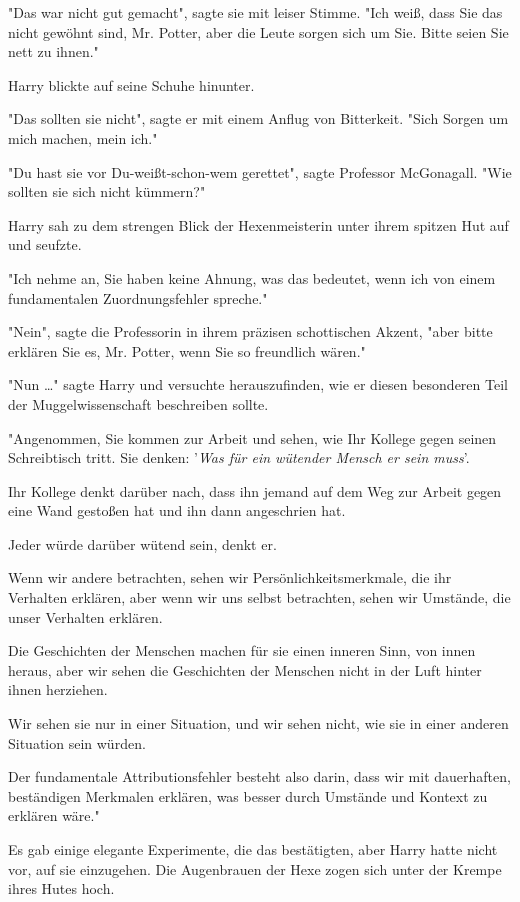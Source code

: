 {"Das war nicht gut gemacht", sagte sie mit leiser Stimme. "Ich weiß, dass Sie das nicht gewöhnt sind, Mr. Potter, aber die Leute sorgen sich um Sie. Bitte seien Sie nett zu ihnen."

Harry blickte auf seine Schuhe hinunter.

"Das sollten sie nicht", sagte er mit einem Anflug von Bitterkeit. "Sich Sorgen um mich machen, mein ich."

"Du hast sie vor Du-weißt-schon-wem gerettet", sagte Professor McGonagall. "Wie sollten sie sich nicht kümmern?"

Harry sah zu dem strengen Blick der Hexenmeisterin unter ihrem spitzen Hut auf und seufzte.

"Ich nehme an, Sie haben keine Ahnung, was das bedeutet, wenn ich von einem fundamentalen Zuordnungsfehler spreche."

"Nein", sagte die Professorin in ihrem präzisen schottischen Akzent, "aber bitte erklären Sie es, Mr. Potter, wenn Sie so freundlich wären."

"Nun …" sagte Harry und versuchte herauszufinden, wie er diesen besonderen Teil der Muggelwissenschaft beschreiben sollte.

"Angenommen, Sie kommen zur Arbeit und sehen, wie Ihr Kollege gegen seinen Schreibtisch tritt. Sie denken: '\emph{Was für ein wütender Mensch er sein muss}'.

Ihr Kollege denkt darüber nach, dass ihn jemand auf dem Weg zur Arbeit gegen eine Wand gestoßen hat und ihn dann angeschrien hat.

Jeder würde darüber wütend sein, denkt er.

Wenn wir andere betrachten, sehen wir Persönlichkeitsmerkmale, die ihr Verhalten erklären, aber wenn wir uns selbst betrachten, sehen wir Umstände, die unser Verhalten erklären.

Die Geschichten der Menschen machen für sie einen inneren Sinn, von innen heraus, aber wir sehen die Geschichten der Menschen nicht in der Luft hinter ihnen herziehen.

Wir sehen sie nur in einer Situation, und wir sehen nicht, wie sie in einer anderen Situation sein würden.

Der fundamentale Attributionsfehler besteht also darin, dass wir mit dauerhaften, beständigen Merkmalen erklären, was besser durch Umstände und Kontext zu erklären wäre."

Es gab einige elegante Experimente, die das bestätigten, aber Harry hatte nicht vor, auf sie einzugehen. Die Augenbrauen der Hexe zogen sich unter der Krempe ihres Hutes hoch.

}

